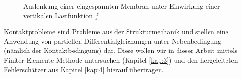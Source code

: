 \begin{figure}[h]
\begin{center}
\hfill
{}
\end{center}
\caption{Auslenkung einer eingespannten Membran unter Einwirkung einer vertikalen Lastfunktion $f$\label{abb:1.1}}
\end{figure}

Kontaktprobleme sind Probleme aus der Strukturmechanik und stellen eine Anwendung von partiellen Differentialgleichungen unter Nebenbedingung (nämlich der Kontaktbedingung) dar. Diese wollen wir in dieser Arbeit mittels Finiter-Elemente-Methode untersuchen (Kapitel \ref{kap:3}) und den hergeleiteten Fehlerschätzer aus Kapitel \ref{kap:4} hierauf übertragen.

